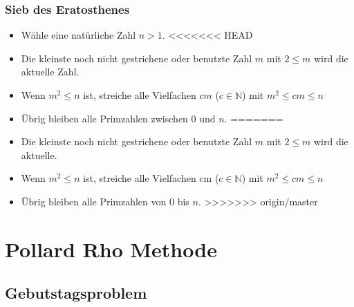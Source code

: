 \documentclass[mathserif, compress, german]{beamer}
\begin{document}
\begin{frame}
  \frametitle{Sieb des Eratosthenes}   %

  \begin{itemize}
  \item<2-> W\"ahle eine nat\"urliche Zahl $n> 1$.
  \vspace{3mm}
<<<<<<< HEAD
  \item<3-> Die kleinste noch nicht gestrichene oder benutzte Zahl $m$ mit $2\leq m$ wird die aktuelle Zahl.
  \vspace{3mm}
  \item<4-> Wenn $m^2 \leq n$ ist, streiche alle Vielfachen $cm$ ($c \in \mathbb{N}$) mit $m^2 \leq cm \leq n$
  \vspace{3mm}
  \item<5-> \"Ubrig bleiben alle Primzahlen zwischen $0$ und $n$.
=======
  \item<3-> Die kleinste noch nicht gestrichene oder benutzte Zahl $m$ mit $2\leq m$ wird die aktuelle.
  \vspace{3mm}
  \item<4-> Wenn $m^2 \leq n$ ist, streiche alle Vielfachen cm ($c \in \mathbb{N}$) mit $m^2 \leq cm \leq n$
  \vspace{3mm}
  \item<5-> \"Ubrig bleiben alle Primzahlen von $0$ bis $n$.
>>>>>>> origin/master
  \end{itemize}
\end{frame}


\section{Pollard Rho Methode}

\subsection{Gebutstagsproblem}
\end{document}
